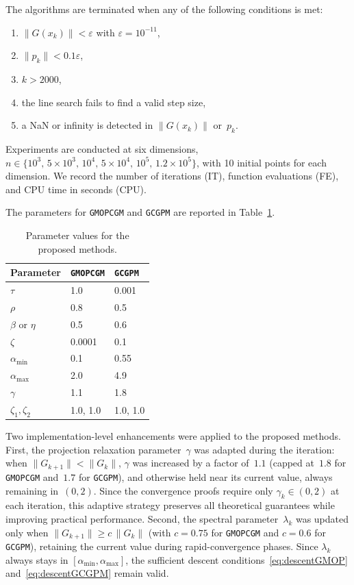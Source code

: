 \documentclass{article}
\theoremstyle{plain}
\theoremstyle{definition}
\theoremstyle{remark}
\newcommand{\norm}[1]{\|#1\|}
\newcommand{\algoname}[1]{{\small\texttt{#1}}}
\newcommand{\GMOPCGM}{\algoname{GMOPCGM}}
\newcommand{\GCGPM}{\algoname{GCGPM}}
\begin{document}
The algorithms are terminated when any of the following conditions is met:
\begin{enumerate}[label=(\roman*), nosep]
  \item $\norm{G(x_k)} < \varepsilon$ with $\varepsilon = 10^{-11}$,
  \item $\norm{p_k} < 0.1\varepsilon$,
  \item $k > 2000$,
  \item the line search fails to find a valid step size,
  \item a NaN or infinity is detected in $\norm{G(x_k)}$ or~$p_k$.
\end{enumerate}
Experiments are conducted at six dimensions, $n \in \{10^3,\, 5{\times}10^3,\, 10^4,\, 5{\times}10^4,\, 10^5,\, 1.2{\times}10^5\}$, with 10 initial points for each dimension. We record the number of iterations (IT), function evaluations (FE), and CPU time in seconds (CPU).

The parameters for \GMOPCGM{} and \GCGPM{} are reported in Table~\ref{tab:params}.

\begin{table}[htbp]
\centering
\caption{Parameter values for the proposed methods.}\label{tab:params}
\begin{tabular}{lll}
\toprule
Parameter & \GMOPCGM & \GCGPM \\
\midrule
$\tau$ & 1.0 & 0.001 \\
$\rho$ & 0.8 & 0.5 \\
$\beta$ or $\eta$ & 0.5 & 0.6 \\
$\zeta$ & 0.0001 & 0.1 \\
$\alpha_{\min}$ & 0.1 & 0.55 \\
$\alpha_{\max}$ & 2.0 & 4.9 \\
$\gamma$ & 1.1 & 1.8 \\
$\zeta_1, \zeta_2$ & 1.0, 1.0 & 1.0, 1.0 \\
\bottomrule
\end{tabular}
\end{table}

Two implementation-level enhancements were applied to the proposed methods. First, the projection relaxation parameter~$\gamma$ was adapted during the iteration: when $\norm{G_{k+1}} < \norm{G_k}$, $\gamma$ was increased by a factor of~$1.1$ (capped at~$1.8$ for \GMOPCGM{} and~$1.7$ for \GCGPM), and otherwise held near its current value, always remaining in~$(0,2)$. Since the convergence proofs require only $\gamma_k \in (0,2)$ at each iteration, this adaptive strategy preserves all theoretical guarantees while improving practical performance. Second, the spectral parameter~$\lambda_k$ was updated only when $\norm{G_{k+1}} \geq c\,\norm{G_k}$ (with $c = 0.75$ for \GMOPCGM{} and $c = 0.6$ for \GCGPM), retaining the current value during rapid-convergence phases. Since $\lambda_k$ always stays in $[\alpha_{\min},\alpha_{\max}]$, the sufficient descent conditions~\eqref{eq:descentGMOP} and~\eqref{eq:descentGCGPM} remain valid.
\end{document}
